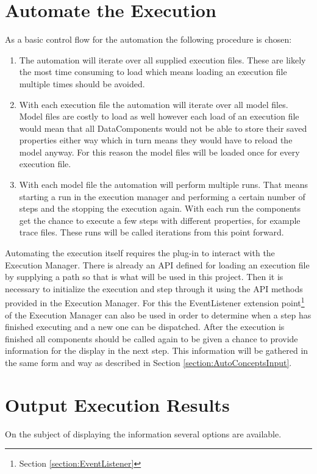 \section{Automate the Execution}
\label{section:AutoConceptsExecution}
As a basic control flow for the automation the following procedure is chosen:
\begin{enumerate}
 \item The automation will iterate over all supplied execution files. These are likely the most time consuming
to load which means loading an execution file multiple times should be avoided.
 \item With each execution file the automation will iterate over all model files. Model files are costly to load
as well however each load of an execution file would mean that all DataComponents would not be able to store their
saved properties either way which in turn means they would have to reload the model anyway. For this reason the model
files will be loaded once for every execution file.
 \item With each model file the automation will perform multiple runs. That means starting a run in the execution manager
and performing a certain number of steps and the stopping the execution again. With each run the components get the chance
to execute a few steps with different properties, for example trace files. These runs will be called iterations from this
point forward.
\end{enumerate}

Automating the execution itself requires the plug-in to interact with the Execution Manager.
There is already an \ac{API} defined for loading an execution file by supplying a path so that
is what will be used in this project.
Then it is necessary to initialize the execution and step through it using the \ac{API}
methods provided in the Execution Manager. For this the EventListener extension point\footnote{Section \ref{section:EventListener}} of the 
Execution Manager can also be used in order to determine when a step has finished executing and
a new one can be dispatched.
After the execution is finished all components should be called again to be given
a chance to provide information for the display in the next step. This information
will be gathered in the same form and way as described in Section \ref{section:AutoConceptsInput}.

\section{Output Execution Results}
\label{section:AutoConceptsOutput}
On the subject of displaying the information several options are available.

